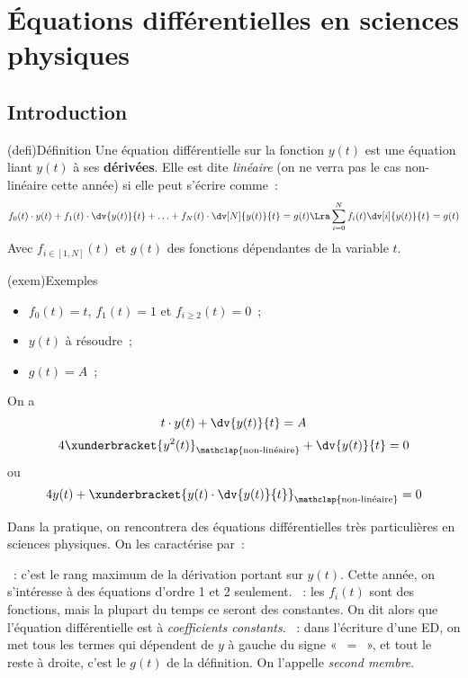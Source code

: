 \documentclass[a4paper, 12pt, garamond]{book}
\begin{document}
\setcounter{chapter}{6}

\chapter{\'Equations diff\'erentielles en sciences physiques}

\section{Introduction}
\begin{tcb}(defi){Définition}
	Une équation différentielle sur la fonction $y(t)$
	est une équation liant $y(t)$ à ses \textbf{dérivées}. Elle est dite
	\textit{linéaire} (on ne verra pas le cas
	non-linéaire cette année) si elle peut s’écrire comme~:
	\[
		f_0(t) \cdot y(t) + f_1(t) \cdot \dv{y(t)}{t} + \ldots + f_N(t) \cdot
		\dv[N]{y(t)}{t} = g(t)
		\Lra
		\sum_{i=0}^{N} f_i(t) \dv[i]{y(t)}{t} = g(t)
	\]
  Avec $f_{i \in [1,N]}(t)$ et $g(t)$ des fonctions dépendantes de la variable
	$t$.
\end{tcb}

\begin{tcb}[sidebyside, sidebyside align=top](exem){Exemples}
	\begin{itemize}
		\item $f_0(t) = t$, $f_1(t) = 1$ et $f_{i \geq 2}(t) = 0$~;
		\item $y(t)$ à résoudre~;
		\item $g(t) = A$~;
	\end{itemize}
	On a
	\[
		t \cdot y(t) + \dv{y(t)}{t} = A
	\]
	\tcblower
	\[
		4\xunderbracket{y^{2}(t)}_{\mathclap{\text{non-linéaire}}} +
		\dv{y(t)}{t} = 0
	\]
	ou
	\[
		4y(t) +
		\xunderbracket{y(t) \cdot \dv{y(t)}{t}}_{\mathclap{\text{non-linéaire}}} = 0
	\]
\end{tcb}

Dans la pratique, on rencontrera des équations différentielles très
particulières en sciences physiques. On les caractérise par~:
\begin{itemize}
	~: c'est le rang maximum de la dérivation portant sur
	$y(t)$. Cette année, on s'intéresse à des équations d'ordre 1 et 2 seulement.
	~: les $f_i(t)$ sont des fonctions, mais la plupart
	du temps ce seront des constantes. On dit alors que l'équation différentielle
	est à \textit{coefficients constants}.
	~: dans l'écriture d'une ED, on met tous les termes
	qui dépendent de $y$ à gauche du signe «~$=$~», et tout le reste à droite,
	c'est le $g(t)$ de la définition. On l'appelle \textit{second membre}.
\end{itemize}
\end{document}
